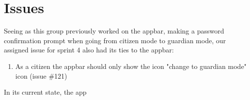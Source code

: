 \section{Issues}
Seeing as this group previously worked on the appbar, making a password confirmation prompt when going from citizen mode to guardian mode, our assigned issue for sprint 4 also had its ties to the appbar:

\begin{enumerate}
  \item As a citizen the appbar should only show the icon "change to guardian mode" icon (issue \#121)
\end{enumerate}

In its current state, the app

